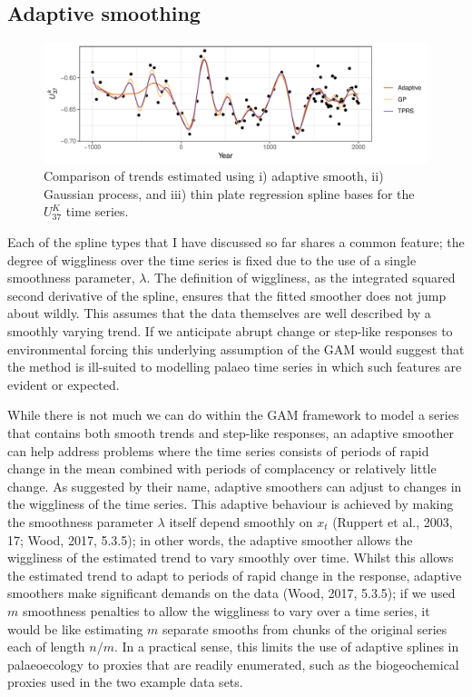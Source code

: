 \documentclass[12pt,]{article}
\newcommand{\uk}{\ensuremath{\mathit{U}^{\mathit{K}}_{\mathup{37}}}}
\begin{document}
\subsection{Adaptive smoothing}\label{adaptive-smoothing}

\begin{figure}

{\centering \includegraphics[width=0.8\linewidth]{manuscript_files/figure-latex/braya-so-model-comparisons-1} 

}

\caption{Comparison of trends estimated using i) adaptive smooth, ii) Gaussian process, and iii) thin plate regression spline bases for the \uk{} time series.}\label{fig:braya-so-model-comparisons}
\end{figure}

Each of the spline types that I have discussed so far shares a common
feature; the degree of wiggliness over the time series is fixed due to
the use of a single smoothness parameter, \(\lambda\). The definition of
wiggliness, as the integrated squared second derivative of the spline,
ensures that the fitted smoother does not jump about wildly. This
assumes that the data themselves are well described by a smoothly
varying trend. If we anticipate abrupt change or step-like responses to
environmental forcing this underlying assumption of the GAM would
suggest that the method is ill-suited to modelling palaeo time series in
which such features are evident or expected.

While there is not much we can do within the GAM framework to model a
series that contains both smooth trends and step-like responses, an
adaptive smoother can help address problems where the time series
consists of periods of rapid change in the mean combined with periods of
complacency or relatively little change. As suggested by their name,
adaptive smoothers can adjust to changes in the wiggliness of the time
series. This adaptive behaviour is achieved by making the smoothness
parameter \(\lambda\) itself depend smoothly on \(x_t\) (Ruppert et al.,
2003, 17; Wood, 2017, 5.3.5); in other words, the adaptive smoother
allows the wiggliness of the estimated trend to vary smoothly over time.
Whilst this allows the estimated trend to adapt to periods of rapid
change in the response, adaptive smoothers make significant demands on
the data (Wood, 2017, 5.3.5); if we used \(m\) smoothness penalties to
allow the wiggliness to vary over a time series, it would be like
estimating \(m\) separate smooths from chunks of the original series
each of length \(n/m\). In a practical sense, this limits the use of
adaptive splines in palaeoecology to proxies that are readily
enumerated, such as the biogeochemical proxies used in the two example
data sets.
\end{document}
